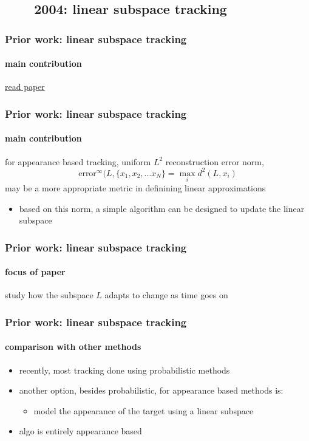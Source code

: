 \subsection{\ \ \ \ 2004: linear subspace tracking}
\begin{frame}
\frametitle{Prior work: linear subspace tracking}
\framesubtitle{main contribution}
\logoCSIPCPL\mypagenum
	{\color{blue}  \href{http://users.ece.gatech.edu/~msalman/papers/2004 CNF, Visual tracking using learned linear subspaces (Ho, Kriegman).pdf}{read paper}}
\end{frame}




\begin{frame}
\frametitle{Prior work: linear subspace tracking}
\framesubtitle{main contribution}
\logoCSIPCPL\mypagenum
	for appearance based tracking, uniform $L^2$ reconstruction error norm,
			\begin{equation*}
				\mbox{error}^\infty(L,\{x_1, x_2, \ldots x_N\}= \max\limits_i d^2 (L, x_i)
			\end{equation*}
	may be a more appropriate metric in definining linear approximations
	\begin{itemize}
		\item based on this norm, a simple algorithm can be designed to update the linear subspace
	\end{itemize}
\end{frame}




\begin{frame}
\frametitle{Prior work: linear subspace tracking}
\framesubtitle{focus of paper}
\logoCSIPCPL\mypagenum
		study how the subspace $L$ adapts to change as time goes on 
\end{frame}




\begin{frame}
\frametitle{Prior work: linear subspace tracking}
\framesubtitle{comparison with other methods}
\logoCSIPCPL\mypagenum
	\begin{itemize}
		\item recently, most tracking done using probabilistic methods
		\item another option, besides probabilistic, for appearance based methods is:
			\begin{itemize}
				\item model the appearance of the target using a linear subspace
			\end{itemize}
		\item algo is entirely appearance based
	\end{itemize}
\end{frame}



